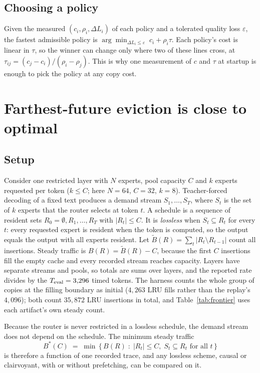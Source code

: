\documentclass{article}
\newcommand{\xf}{\ensuremath{\rho}}
\begin{document}
\subsection{Choosing a policy}
Given the measured $(c_i, \xf_i, \Delta L_i)$ of
each policy and a tolerated quality loss $\varepsilon$, the fastest
admissible policy is $\arg\min_{\Delta L_i \le \varepsilon}\; c_i + \xf_i\tau$.
Each policy's cost is linear in $\tau$, so the winner can change only where
two of these lines cross, at $\tau_{ij} = (c_j - c_i)/(\xf_i - \xf_j)$. This
is why one measurement of $c$ and $\tau$ at startup is enough to pick the
policy at any copy cost.

\section{Farthest-future eviction is close to optimal}
\label{app:math}

\subsection{Setup}
Consider one restricted layer with $N$ experts, pool capacity
$C$ and $k$ experts requested per token ($k \le C$; here $N{=}64$, $C{=}32$,
$k{=}8$). Teacher-forced decoding of a fixed text produces a demand stream
$S_1,\dots,S_T$, where $S_t$ is the set of $k$ experts that the router
selects at token $t$. A schedule is a sequence of resident sets
$R_0=\emptyset, R_1,\dots,R_T$ with $|R_t| \le C$. It is \emph{lossless} when
$S_t \subseteq R_t$ for every $t$: every requested expert is resident when the
token is computed, so the output equals the output with all experts resident.
Let $\widetilde B(R)=\sum_t |R_t \setminus R_{t-1}|$ count all insertions.
Steady traffic is $B(R)=\widetilde B(R)-C$, because the first $C$ insertions
fill the empty cache and every recorded stream reaches capacity. Layers have
separate streams and pools, so totals are sums over layers, and the reported
rate divides by the $T_{\rm eval}=3{,}296$ timed tokens. The harness counts
the whole group of copies at the filling boundary as initial ($4{,}263$ LRU
fills rather than the replay's $4{,}096$); both count $35{,}872$ LRU
insertions in total, and Table~\ref{tab:frontier} uses each artifact's own
steady count.

Because the router is never restricted in a lossless schedule, the demand
stream does not depend on the schedule. The minimum steady traffic
\[
B^*(C) \;=\; \min\,\{\,B(R) \;:\; |R_t| \le C,\; S_t \subseteq R_t \text{ for all } t\,\}
\]
is therefore a function of one recorded trace, and any lossless scheme,
causal or clairvoyant, with or without prefetching, can be compared on it.
\end{document}
